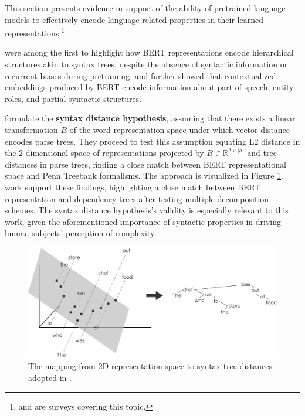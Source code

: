 \documentclass[a4paper, nobind]{templates/ociamthesis}
\begin{document}
This section presents evidence in support of the ability of pretrained language models to effectively encode language-related properties in their learned representations.\footnote{\textcite{rogers-etal-2020-primer} and \textcite{linzen-baroni-2021-syntactic} are surveys covering this topic.}

\textcite{lin-etal-2019-open} were among the first to highlight how BERT representations encode hierarchical structures akin to syntax trees, despite the absence of syntactic information or recurrent biases during pretraining. \textcite{liu-etal-2019-linguistic} and \textcite{tenney-etal-2019-bert} further showed that contextualized embeddings produced by BERT encode information about part-of-speech, entity roles, and partial syntactic structures.

\textcite{hewitt-manning-2019-structural} formulate the \textbf{syntax distance hypothesis}, assuming that there exists a linear transformation \(B\) of the word representation space under which vector distance encodes parse trees. They proceed to test this assumption equating L2 distance in the 2-dimensional space of representations projected by \(B \in \mathbb{R}^{2 \times |h|}\) and tree distances in parse trees, finding a close match between BERT representational space and Penn Treebank formalisms. The approach is visualized in Figure \ref{fig:struct-probe}. \textcite{jawahar-etal-2019-bert} work support these findings, highlighting a close match between BERT representation and dependency trees after testing multiple decomposition schemes. The syntax distance hypothesis's validity is especially relevant to this work, given the aforementioned importance of syntactic properties in driving human subjects' perception of complexity.



\begin{figure}

{\centering \includegraphics[width=0.85\linewidth]{figures/2_struct_probe} 

}

\caption{The mapping from 2D representation space to syntax tree distances adopted in \textcite{hewitt-manning-2019-structural}.}\label{fig:struct-probe}
\end{figure}
\end{document}
